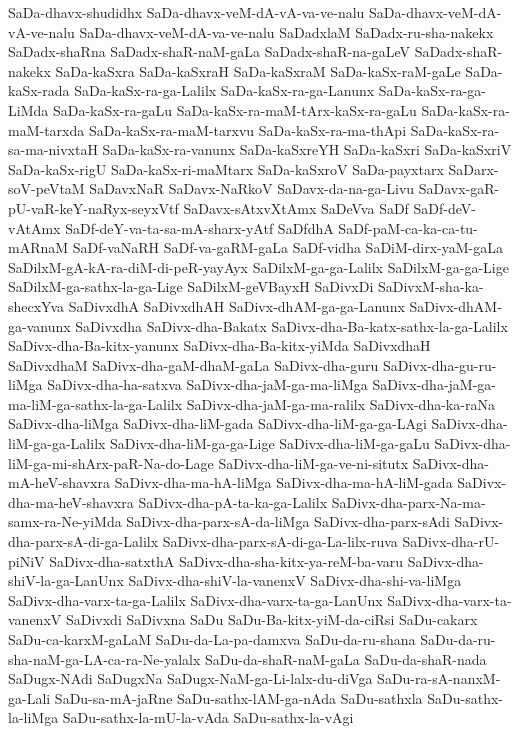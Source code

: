 {SaDa-dhavx-shudidhx
SaDa-dhavx-veM-dA-vA-va-ve-nalu
SaDa-dhavx-veM-dA-vA-ve-nalu
SaDa-dhavx-veM-dA-va-ve-nalu
SaDadxlaM
SaDadx-ru-sha-nakekx
SaDadx-shaRna
SaDadx-shaR-naM-gaLa
SaDadx-shaR-na-gaLeV
SaDadx-shaR-nakekx
SaDa-kaSxra
SaDa-kaSxraH
SaDa-kaSxraM
SaDa-kaSx-raM-gaLe
SaDa-kaSx-rada
SaDa-kaSx-ra-ga-Lalilx
SaDa-kaSx-ra-ga-Lanunx
SaDa-kaSx-ra-ga-LiMda
SaDa-kaSx-ra-gaLu
SaDa-kaSx-ra-maM-tArx-kaSx-ra-gaLu
SaDa-kaSx-ra-maM-tarxda
SaDa-kaSx-ra-maM-tarxvu
SaDa-kaSx-ra-ma-thApi
SaDa-kaSx-ra-sa-ma-nivxtaH
SaDa-kaSx-ra-vanunx
SaDa-kaSxreYH
SaDa-kaSxri
SaDa-kaSxriV
SaDa-kaSx-rigU
SaDa-kaSx-ri-maMtarx
SaDa-kaSxroV
SaDa-payxtarx
SaDarx-soV-peVtaM
SaDavxNaR
SaDavx-NaRkoV
SaDavx-da-na-ga-Livu
SaDavx-gaR-pU-vaR-keY-naRyx-seyxVtf
SaDavx-sAtxvXtAmx
SaDeVva
SaDf
SaDf-deV-vAtAmx
SaDf-deY-va-ta-sa-mA-sharx-yAtf
SaDfdhA
SaDf-paM-ca-ka-ca-tu-mARnaM
SaDf-vaNaRH
SaDf-va-gaRM-gaLa
SaDf-vidha
SaDiM-dirx-yaM-gaLa
SaDilxM-gA-kA-ra-diM-di-peR-yayAyx
SaDilxM-ga-ga-Lalilx
SaDilxM-ga-ga-Lige
SaDilxM-ga-sathx-la-ga-Lige
SaDilxM-geVBayxH
SaDivxDi
SaDivxM-sha-ka-shecxYva
SaDivxdhA
SaDivxdhAH
SaDivx-dhAM-ga-ga-Lanunx
SaDivx-dhAM-ga-vanunx
SaDivxdha
SaDivx-dha-Bakatx
SaDivx-dha-Ba-katx-sathx-la-ga-Lalilx
SaDivx-dha-Ba-kitx-yanunx
SaDivx-dha-Ba-kitx-yiMda
SaDivxdhaH
SaDivxdhaM
SaDivx-dha-gaM-dhaM-gaLa
SaDivx-dha-guru
SaDivx-dha-gu-ru-liMga
SaDivx-dha-ha-satxva
SaDivx-dha-jaM-ga-ma-liMga
SaDivx-dha-jaM-ga-ma-liM-ga-sathx-la-ga-Lalilx
SaDivx-dha-jaM-ga-ma-ralilx
SaDivx-dha-ka-raNa
SaDivx-dha-liMga
SaDivx-dha-liM-gada
SaDivx-dha-liM-ga-ga-LAgi
SaDivx-dha-liM-ga-ga-Lalilx
SaDivx-dha-liM-ga-ga-Lige
SaDivx-dha-liM-ga-gaLu
SaDivx-dha-liM-ga-mi-shArx-paR-Na-do-Lage
SaDivx-dha-liM-ga-ve-ni-situtx
SaDivx-dha-mA-heV-shavxra
SaDivx-dha-ma-hA-liMga
SaDivx-dha-ma-hA-liM-gada
SaDivx-dha-ma-heV-shavxra
SaDivx-dha-pA-ta-ka-ga-Lalilx
SaDivx-dha-parx-Na-ma-samx-ra-Ne-yiMda
SaDivx-dha-parx-sA-da-liMga
SaDivx-dha-parx-sAdi
SaDivx-dha-parx-sA-di-ga-Lalilx
SaDivx-dha-parx-sA-di-ga-La-lilx-ruva
SaDivx-dha-rU-piNiV
SaDivx-dha-satxthA
SaDivx-dha-sha-kitx-ya-reM-ba-varu
SaDivx-dha-shiV-la-ga-LanUnx
SaDivx-dha-shiV-la-vanenxV
SaDivx-dha-shi-va-liMga
SaDivx-dha-varx-ta-ga-Lalilx
SaDivx-dha-varx-ta-ga-LanUnx
SaDivx-dha-varx-ta-vanenxV
SaDivxdi
SaDivxna
SaDu
SaDu-Ba-kitx-yiM-da-ciRsi
SaDu-cakarx
SaDu-ca-karxM-gaLaM
SaDu-da-La-pa-damxva
SaDu-da-ru-shana
SaDu-da-ru-sha-naM-ga-LA-ca-ra-Ne-yalalx
SaDu-da-shaR-naM-gaLa
SaDu-da-shaR-nada
SaDugx-NAdi
SaDugxNa
SaDugx-NaM-ga-Li-lalx-du-diVga
SaDu-ra-sA-nanxM-ga-Lali
SaDu-sa-mA-jaRne
SaDu-sathx-lAM-ga-nAda
SaDu-sathxla
SaDu-sathx-la-liMga
SaDu-sathx-la-mU-la-vAda
SaDu-sathx-la-vAgi
}
